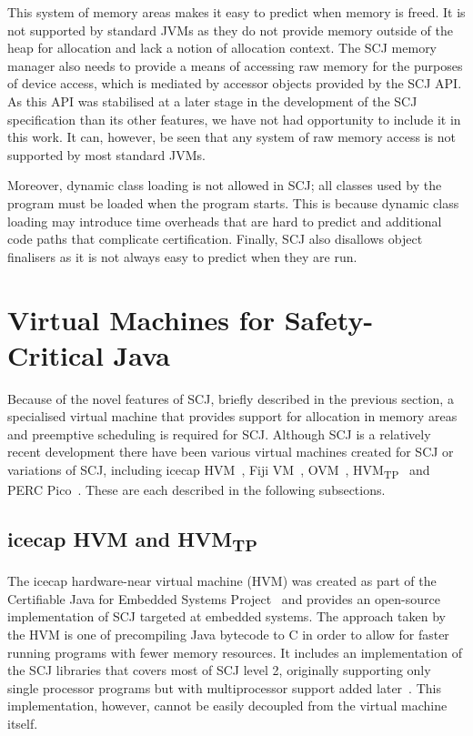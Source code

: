 This system of memory areas makes it easy to predict when memory is
freed.
It is not supported by standard JVMs as they do not provide memory
outside of the heap for allocation and lack a notion of allocation
context.
The SCJ memory manager also needs to provide a means of accessing raw
memory for the purposes of device access, which is mediated by
accessor objects provided by the SCJ API.
As this API was stabilised at a later stage in the development of the
SCJ specification than its other features, we have not had opportunity
to include it in this work.
It can, however, be seen that any system of raw memory access is not
supported by most standard JVMs.

Moreover, dynamic class loading is not allowed in SCJ; all classes
used by the program must be loaded when the program starts.
This is because dynamic class loading may introduce time overheads
that are hard to predict and additional code paths that complicate
certification.
Finally, SCJ also disallows object finalisers as it is not always easy
to predict when they are run.

\section{Virtual Machines for Safety-Critical Java}
\label{virtual-machines-section}


Because of the novel features of SCJ, briefly described in the
previous section, a specialised virtual machine that provides support
for allocation in memory areas and preemptive scheduling is required
for SCJ.
Although SCJ is a relatively recent development there have been
various virtual machines created for SCJ or variations of SCJ,
including icecap HVM~\cite{sondergaard2012}, Fiji VM~\cite{pizlo2009},
OVM~\cite{armbruster2007}, HVM\textsubscript{TP}~\cite{luckow2014} and
PERC Pico~\cite{atego2015, richard2010}.
These are each described in the following subsections.

\subsection{icecap HVM and
  \texorpdfstring{HVM\textsubscript{TP}}{HVMTP}}


The icecap hardware-near virtual machine (HVM) was created as part of
the Certifiable Java for Embedded Systems Project~\cite{schoeberl2014}
and provides an open-source implementation of SCJ targeted at embedded
systems.
The approach taken by the HVM is one of precompiling Java bytecode to
C in order to allow for faster running programs with fewer memory
resources.
It includes an implementation of the SCJ libraries that covers most of
SCJ level 2, originally supporting only single processor programs but
with multiprocessor support added later~\cite{zhao2015}.
This implementation, however, cannot be easily decoupled from the
virtual machine itself.

